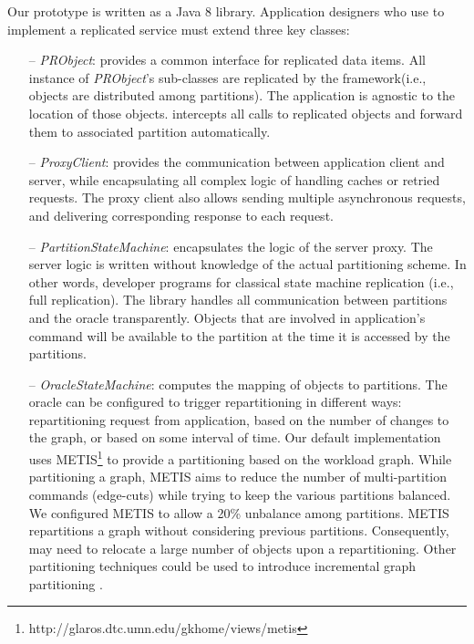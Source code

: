 Our  \dynastar prototype is written as a Java 8 library. Application designers
who use \dynastar to implement a replicated service must extend three key
classes:
 \begin{itemize}

 \item[--] \emph{PRObject}: provides a common interface for replicated data
 items. All instance of \emph{PRObject}'s sub-classes are replicated by the
 framework(i.e., objects are distributed among partitions). The application is
 agnostic to the location of those objects. \dynastar intercepts all calls to
 replicated objects and forward them to associated partition automatically.

 \item[--] \emph{ProxyClient}: provides the communication between application
 client and server, while encapsulating all complex logic of handling caches or
 retried requests. The proxy client also allows sending multiple asynchronous
 requests, and delivering corresponding response to each request.

 \item[--] \emph{PartitionStateMachine}: encapsulates the logic of the server
  proxy. The server logic is written without knowledge of the actual
  partitioning scheme. In other words, developer programs for classical state
  machine replication (i.e., full replication). The \dynastar library handles
  all communication between partitions and the oracle transparently. Objects
  that are involved in application's command will be available to the
  partition at the time it is accessed by the partitions.

 \item[--] \emph{OracleStateMachine}: computes the mapping of objects to
  partitions. The oracle can be configured to trigger repartitioning in
  different ways: repartitioning request from application, based on the number
  of changes to the graph, or based on some interval of time. Our default
  implementation uses
  METIS\footnote{http://glaros.dtc.umn.edu/gkhome/views/metis} to provide a
  partitioning based on the workload graph. While partitioning a graph, METIS
  aims to reduce the number of multi-partition commands (edge-cuts) while
  trying to keep the various partitions balanced. We configured METIS to allow
  a 20\% unbalance among partitions. METIS repartitions a graph without
  considering previous partitions. Consequently, \dynastar may need to
  relocate a large number of objects upon a repartitioning. Other partitioning
  techniques could be used to introduce incremental graph partitioning
  \cite{SerafiniTEPAS16}.
 \end{itemize}

